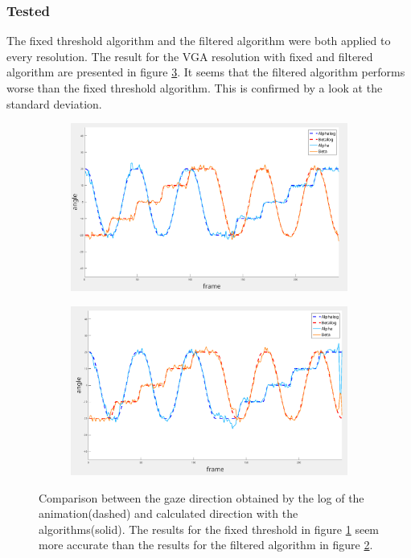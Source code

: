 \subsubsection{Tested}

The fixed threshold algorithm and the filtered algorithm were both applied to every resolution. The result for the VGA resolution with fixed and filtered algorithm are presented in figure \ref{fig:VGA}. It seems that the filtered algorithm performs worse than the fixed threshold algorithm. This is confirmed by a look at the standard deviation.

\begin{figure}
	\begin{subfigure}{.5\textwidth}
		\centering
		\includegraphics[width=\linewidth]{images/fixed_middle.png}
		\caption{}
		\label{fig:fixedMiddle}
	\end{subfigure}
	\begin{subfigure}{.5\textwidth}
		\centering
		\includegraphics[width=\linewidth]{images/normal_middle.png}
		\caption{}
		\label{fig:normalMiddle}
	\end{subfigure}

	\caption{Comparison between the gaze direction obtained by the log of the animation(dashed) and calculated direction with the algorithms(solid). The results for the fixed threshold in figure \ref{fig:fixedMiddle} seem more accurate than the results for the filtered algorithm in figure \ref{fig:normalMiddle}.}
	\label{fig:VGA}
\end{figure}

